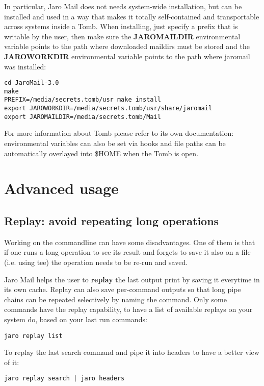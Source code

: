 \documentclass[a4,onecolumn,portrait]{article}
\begin{document}
In particular, Jaro Mail does not needs system-wide installation, but
can be installed and used in a way that makes it totally
self-contained and transportable across systems inside a Tomb. When
installing, just specify a prefix that is writable by the user, then
make sure the \textbf{JAROMAILDIR} environmental variable points to the path
where downloaded maildirs must be stored and the \textbf{JAROWORKDIR}
environmental variable points to the path where jaromail was
installed:

\begin{verbatim}
cd JaroMail-3.0
make
PREFIX=/media/secrets.tomb/usr make install
export JAROWORKDIR=/media/secrets.tomb/usr/share/jaromail
export JAROMAILDIR=/media/secrets.tomb/Mail
\end{verbatim}

For more information about Tomb please refer to its own documentation: environmental variables can also be set via hooks and file paths can be automatically overlayed into \$HOME when the Tomb is open.

\section{Advanced usage}
\label{sec-12}
\subsection{Replay: avoid repeating long operations}
\label{sec-12-1}

Working on the commandline can have some disadvantages. One of them is that if one runs a long operation to see its result and forgets to save it also on a file (i.e. using tee) the operation needs to be re-run and saved.

Jaro Mail helps the user to \textbf{replay} the last output print by saving it everytime in its own cache. Replay can also save per-command outputs so that long pipe chains can be repeated selectively by naming the command. Only some commands have the replay capability, to have a list of available replays on your system do, based on your last run commands:

\begin{verbatim}
jaro replay list
\end{verbatim}

To replay the last search command and pipe it into headers to have a better view of it:

\begin{verbatim}
jaro replay search | jaro headers
\end{verbatim}
\end{document}

